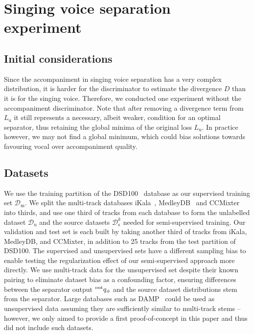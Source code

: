 \documentclass{article}
\begin{document}
\section{Singing voice separation experiment}
\label{sec:experiment}

\subsection{Initial considerations}
Since the accompaniment in singing voice separation has a very complex distribution, it is harder for the discriminator to estimate the divergence $D$ than it is for the singing voice.
Therefore, we conducted one experiment without the accompaniment discriminator.
Note that after removing a divergence term from $L_{\text{u}}$ it still represents a necessary, albeit weaker, condition for an optimal separator, thus retaining the global minima of the original loss $L_{\text{u}}$.
In practice however, we may not find a global minimum, which could bias solutions towards favouring vocal over accompaniment quality.

\subsection{Datasets}

We use the training partition of the DSD100~\cite{Liutkus2017} database as our supervised training set $\mathcal{D}_{\text{m}}$.
We split the multi-track databases iKala~\cite{Chan2015}, MedleyDB~\cite{Bittner2014} and CCMixter~\cite{Liutkus2015} into thirds, and use one third of tracks from each database to form the unlabelled dataset $\mathcal{D}_{\text{u}}$ and the source datasets $\mathcal{D}^k_{\text{s}}$ needed for semi-supervised training.
Our validation and test set is each built by taking another third of tracks from iKala, MedleyDB, and CCMixter, in addition to 25 tracks from the test partition of DSD100.
The supervised and unsupervised sets have a different sampling bias to enable testing the regularization effect of our semi-supervised approach more directly.
We use multi-track data for the unsupervised set despite their known pairing to eliminate dataset bias as a confounding factor, ensuring differences between the separator output $\prescript{\text{out}}{}{q}_{\phi}$ and the source dataset distributions stem from the separator.
Large databases such as DAMP~\cite{Smith2013} could be used as unsupervised data assuming they are sufficiently similar to multi-track stems -- however, we only aimed to provide a first proof-of-concept in this paper and thus did not include such datasets.
\end{document}
